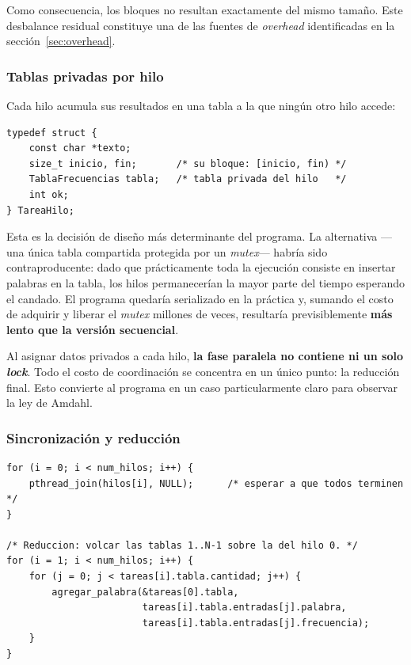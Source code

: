 \documentclass[11pt,letterpaper]{article}
\newcommand{\destacado}[2][azulcl]{%
  \begin{cajadest}[#1]\small #2\end{cajadest}}
\begin{document}
Como consecuencia, los bloques no resultan exactamente del mismo tamaño. Este
desbalance residual constituye una de las fuentes de \emph{overhead} identificadas
en la sección~\ref{sec:overhead}.

\subsubsection{Tablas privadas por hilo}

Cada hilo acumula sus resultados en una tabla a la que ningún otro hilo accede:

\begin{lstlisting}[caption={Descriptor de tarea asignado a cada hilo}]
typedef struct {
    const char *texto;
    size_t inicio, fin;       /* su bloque: [inicio, fin) */
    TablaFrecuencias tabla;   /* tabla privada del hilo   */
    int ok;
} TareaHilo;
\end{lstlisting}

Esta es la decisión de diseño más determinante del programa. La alternativa
—una única tabla compartida protegida por un \emph{mutex}— habría sido
contraproducente: dado que prácticamente toda la ejecución consiste en insertar
palabras en la tabla, los hilos permanecerían la mayor parte del tiempo
esperando el candado. El programa quedaría serializado en la práctica y, sumando
el costo de adquirir y liberar el \emph{mutex} millones de veces, resultaría
previsiblemente \textbf{más lento que la versión secuencial}.

\destacado[verdeok]{Al asignar datos privados a cada hilo, \textbf{la fase paralela
no contiene ni un solo \emph{lock}}. Todo el costo de coordinación se concentra en
un único punto: la reducción final. Esto convierte al programa en un caso
particularmente claro para observar la ley de Amdahl.}

\subsubsection{Sincronización y reducción}

\begin{lstlisting}[caption={Sincronización mediante \texttt{join} y reducción de las tablas}]
for (i = 0; i < num_hilos; i++) {
    pthread_join(hilos[i], NULL);      /* esperar a que todos terminen */
}

/* Reduccion: volcar las tablas 1..N-1 sobre la del hilo 0. */
for (i = 1; i < num_hilos; i++) {
    for (j = 0; j < tareas[i].tabla.cantidad; j++) {
        agregar_palabra(&tareas[0].tabla,
                        tareas[i].tabla.entradas[j].palabra,
                        tareas[i].tabla.entradas[j].frecuencia);
    }
}
\end{lstlisting}
\end{document}
